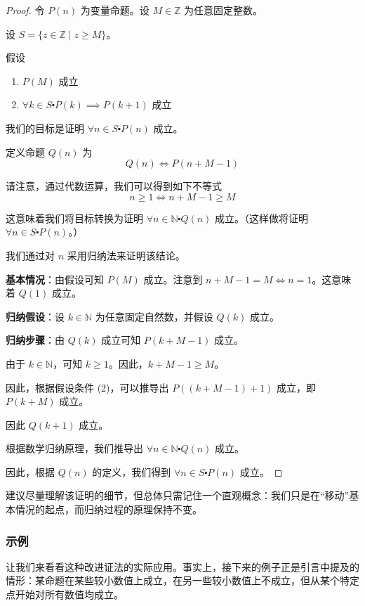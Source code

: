 \begin{proof}
    令 $P(n)$ 为变量命题。设 $M \in \mathbb{Z}$ 为任意固定整数。

    设 $S = \{z \in \mathbb{Z} \mid z \ge M\}$。

    假设
    \begin{enumerate}[label=(\arabic*)]
        \item $P(M)$ 成立
        \item $\forall k \in S \centerdot P(k) \implies P(k + 1)$ 成立
    \end{enumerate}

    我们的目标是证明 $\forall n \in S \centerdot P(n)$ 成立。

    定义命题 $Q(n)$ 为
    \[Q(n) \iff P(n+M-1)\]

    请注意，通过代数运算，我们可以得到如下不等式
    \[n \ge 1 \iff n+M-1 \ge M\]
    
    这意味着我们将目标转换为证明 $\forall n \in \mathbb{N} \centerdot Q(n)$ 成立。（这样做将证明 $\forall n \in S \centerdot P(n)$。）
    
    我们通过对 $n$ 采用归纳法来证明该结论。

    \textbf{基本情况}：由假设可知 $P(M)$ 成立。注意到 $n + M - 1 = M \iff n = 1$。这意味着 $Q(1)$ 成立。

    \textbf{归纳假设}：设 $k \in \mathbb{N}$ 为任意固定自然数，并假设 $Q(k)$ 成立。

    \textbf{归纳步骤}：由 $Q(k)$ 成立可知 $P(k + M - 1)$ 成立。

    由于 $k \in \mathbb{N}$，可知 $k \ge 1$。因此，$k + M - 1 \ge M$。

    因此，根据假设条件 (2)，可以推导出 $P((k+M-1)+1)$ 成立，即 $P(k + M)$ 成立。

    因此 $Q(k + 1)$ 成立。

    根据数学归纳原理，我们推导出 $\forall n \in \mathbb{N} \centerdot Q(n)$ 成立。

    因此，根据 $Q(n)$ 的定义，我们得到 $\forall n \in S \centerdot P(n)$ 成立。
\end{proof}

建议尽量理解该证明的细节，但总体只需记住一个直观概念：我们只是在``移动''基本情况的起点，而归纳过程的原理保持不变。

\subsubsection*{示例}

让我们来看看这种改进证法的实际应用。事实上，接下来的例子正是引言中提及的情形：某命题在某些较小数值上成立，在另一些较小数值上不成立，但从某个特定点开始对所有数值均成立。

